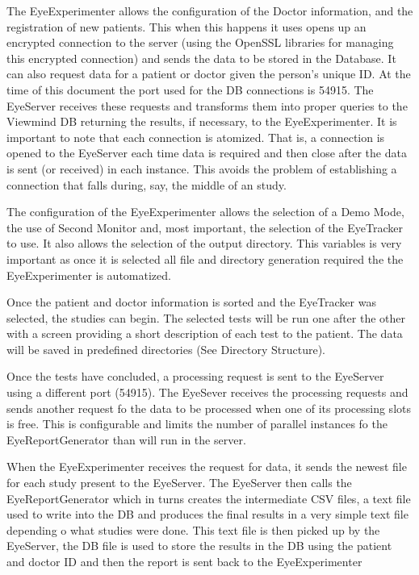 \documentclass[a4paper,10pt]{article}
\begin{document}
The EyeExperimenter allows the configuration of the Doctor information, and the registration of new patients. This when this happens it uses opens up an encrypted connection to the server (using the OpenSSL libraries for managing this encrypted connection) and sends the data to be stored in the Database. It can also request data for a patient or doctor given the person's unique ID. At the time of this document the port used for the DB connections is 54915. The EyeServer receives these requests and transforms them into proper queries to the Viewmind DB returning the results, if necessary, to the EyeExperimenter. It is important to note that each connection is atomized. That is, a connection is opened to the EyeServer each time data is required and then close after the data is sent (or received) in each instance. This avoids the problem of establishing a connection that falls during, say, the middle of an study.

The configuration of the EyeExperimenter allows the selection of a Demo Mode, the use of Second Monitor and, most important, the selection of the EyeTracker to use. It also allows the selection of the output directory. This variables is very important as once it is selected all file and directory generation required the the EyeExperimenter is automatized. 


Once the patient and doctor information is sorted and the EyeTracker was selected, the studies can begin. The selected tests will be run one after the other with a screen providing a short description of each test to the patient. The data will be saved in predefined directories (See Directory Structure).

Once the tests have concluded, a processing request is sent to the EyeServer using a different port (54915). The EyeSever receives the processing requests and sends another request fo the data to be processed when one of its processing slots is free. This is configurable and limits the number of parallel instances fo the EyeReportGenerator than will run in the server. 

When the EyeExperimenter receives the request for data, it sends the newest file for each study present to the EyeServer. The EyeServer then calls the EyeReportGenerator which in turns creates the intermediate CSV files, a text file used to write into the DB and produces the final results in a very simple text file depending o what studies were done. This text file is then picked up by the EyeServer, the DB file is used to store the results in the DB using the patient and doctor ID and then the report is sent back to the EyeExperimenter
\end{document}
